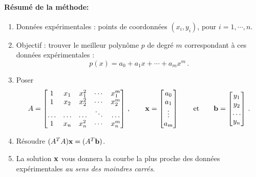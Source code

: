 
\paragraph{Résumé de la méthode:}

\begin{enumerate}
\item Données expérimentales : points de coordonnées $(x_i,y_i)$, pour $i=1,\cdots, n$.
\item Objectif : trouver le meilleur polynôme $p$ de degré $m$ correspondant à ces données expérimentales :
$$
p(x) = a_0 + a_1x+ \cdots + a_mx^m\,.
$$
\item Poser $$
A = \left[ \begin{matrix} 1 & x_1 & x_1^2 & \cdots & x_1^m \\
1 & x_2 & x_2^2 & \cdots & x_2^m \\
\ldots & \ldots & \ldots & \ddots & \ldots \\
1 & x_n & x_n^2 & \cdots & x_n^m \end{matrix} \right]\,,
\quad\quad
\mathbf{x} = \left[ \begin{matrix} a_0\\a_1\\\vdots\\a_m \end{matrix} \right]
\qquad \textrm{et} \qquad
\mathbf{b} = \left[ \begin{matrix} y_1\\y_2 \\ \ldots \\ y_n \end{matrix} \right]\,.
$$
\item R\'esoudre $(A^TA) \mathbf{x} = (A^T\mathbf{b})$.
\item La solution $\mathbf{x}$ vous donnera la courbe la plus proche des données expérimentales \emph{au sens des moindres carrés}.
\end{enumerate}



